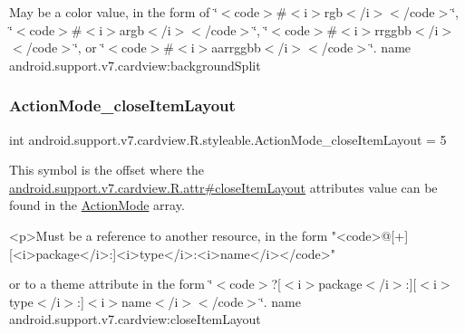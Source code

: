 May be a color value, in the form of \char`\"{}$<$code$>$\#$<$i$>$rgb$<$/i$>$$<$/code$>$\char`\"{}, \char`\"{}$<$code$>$\#$<$i$>$argb$<$/i$>$$<$/code$>$\char`\"{}, \char`\"{}$<$code$>$\#$<$i$>$rrggbb$<$/i$>$$<$/code$>$\char`\"{}, or \char`\"{}$<$code$>$\#$<$i$>$aarrggbb$<$/i$>$$<$/code$>$\char`\"{}.  name android.\+support.\+v7.\+cardview\+:background\+Split \mbox{\label{classandroid_1_1support_1_1v7_1_1cardview_1_1R_1_1styleable_ad542200fde77c9d47f12726ea555d1ae}} 
\subsubsection{\texorpdfstring{Action\+Mode\+\_\+close\+Item\+Layout}{ActionMode\_closeItemLayout}}
{\footnotesize\ttfamily int android.\+support.\+v7.\+cardview.\+R.\+styleable.\+Action\+Mode\+\_\+close\+Item\+Layout = 5\hspace{0.3cm}{\ttfamily [static]}}

This symbol is the offset where the \hyperlink{classandroid_1_1support_1_1v7_1_1cardview_1_1R_1_1attr_af057b1e89a0d6c09f35f4832a983abfa}{android.\+support.\+v7.\+cardview.\+R.\+attr\#close\+Item\+Layout} attribute\textquotesingle{}s value can be found in the \hyperlink{classandroid_1_1support_1_1v7_1_1cardview_1_1R_1_1styleable_aadab2db6f0b961c9bad3b28abb49a9b0}{Action\+Mode} array.

\begin{DoxyVerb}      <p>Must be a reference to another resource, in the form "<code>@[+][<i>package</i>:]<i>type</i>:<i>name</i></code>"
\end{DoxyVerb}
 or to a theme attribute in the form \char`\"{}$<$code$>$?\mbox{[}$<$i$>$package$<$/i$>$\+:\mbox{]}\mbox{[}$<$i$>$type$<$/i$>$\+:\mbox{]}$<$i$>$name$<$/i$>$$<$/code$>$\char`\"{}.  name android.\+support.\+v7.\+cardview\+:close\+Item\+Layout \mbox{\label{classandroid_1_1support_1_1v7_1_1cardview_1_1R_1_1styleable_a5e1ce0fbbed4e137f757b2513a06826c}} 
